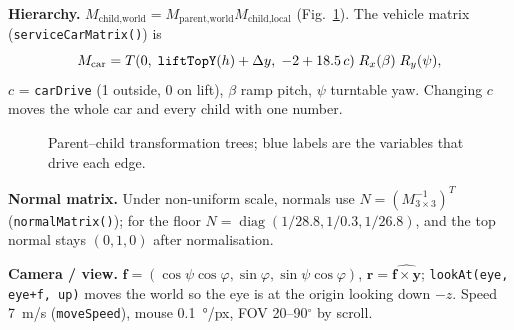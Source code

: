 \documentclass[10pt,a4paper]{article}
\newcommand{\fn}[1]{\texttt{#1}}
\newcommand{\vect}[1]{\mathbf{#1}}
\begin{document}
\textbf{Hierarchy.} $M_{\text{child,world}}=M_{\text{parent,world}}M_{\text{child,local}}$ (Fig.~\ref{fig:hier}). The vehicle matrix
(\fn{serviceCarMatrix()}) is
\begin{equation}M_{\text{car}}=T(0,\;\text{\fn{liftTopY}}(h)+\Delta y,\;-2+18.5\,c)\;R_x(\beta)\;R_y(\psi),\label{eq:car}\end{equation}
$c$ = \fn{carDrive} (1 outside, 0 on lift), $\beta$ ramp pitch, $\psi$ turntable yaw. Changing $c$ moves the whole car and
every child with one number.
\begin{figure}[!htbp]\centering
\resizebox{0.95\textwidth}{!}{}
\caption{Parent--child transformation trees; blue labels are the variables that drive each edge.}\label{fig:hier}
\end{figure}

\textbf{Normal matrix.} Under non-uniform scale, normals use $N=(M_{3\times3}^{-1})^T$ (\fn{normalMatrix()}); for the floor
$N=\operatorname{diag}(1/28.8,1/0.3,1/26.8)$, and the top normal stays $(0,1,0)$ after normalisation.

\textbf{Camera / view.} $\vect f=(\cos\psi\cos\varphi,\sin\varphi,\sin\psi\cos\varphi)$, $\vect r=\widehat{\vect f\times\vect y}$;
\fn{lookAt(eye, eye+f, up)} moves the world so the eye is at the origin looking down $-z$. Speed \SI{7}{m/s}
(\fn{moveSpeed}), mouse \SI{0.1}{\degree/px}, FOV 20--90$^\circ$ by scroll.
\end{document}
